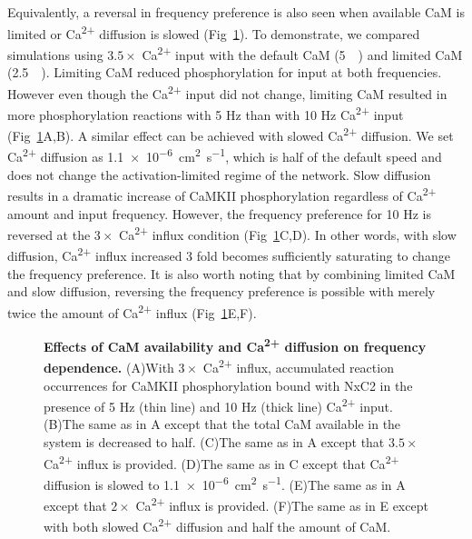 \documentclass[10pt,letterpaper]{article}
\begin{document}
Equivalently, a reversal in frequency preference is also seen when available CaM is limited or Ca\textsuperscript{2+} diffusion is slowed (Fig~\ref{fig9}). To demonstrate, we compared simulations using $3.5\times$ Ca\textsuperscript{2+} input with the default CaM (\SI{5}{\micro\Molar}) and limited CaM (\SI{2.5}{\micro\Molar}). Limiting CaM reduced phosphorylation for input at both frequencies. However even though the Ca\textsuperscript{2+} input did not change, limiting CaM resulted in more phosphorylation reactions with 5 Hz than with 10 Hz Ca\textsuperscript{2+} input (Fig~\ref{fig9}A,B). A similar effect can be achieved with slowed Ca\textsuperscript{2+} diffusion. We set Ca\textsuperscript{2+} diffusion as \SI{1.1e-6}{\square\cm\per\s}, which is half of the default speed and does not change the activation-limited regime of the network. Slow diffusion results in a dramatic increase of CaMKII phosphorylation regardless of Ca\textsuperscript{2+} amount and input frequency. However, the frequency preference for 10 Hz is reversed at the $3\times$ Ca\textsuperscript{2+} influx condition (Fig~\ref{fig9}C,D). In other words, with slow diffusion, Ca\textsuperscript{2+} influx increased 3 fold becomes sufficiently saturating to change the frequency preference. It is also worth noting that by combining limited CaM and slow diffusion, reversing the frequency preference is possible with merely twice the amount of Ca\textsuperscript{2+} influx (Fig~\ref{fig9}E,F). 

\begin{figure}[!h]
	\caption{{\bf Effects of CaM availability and Ca\textsuperscript{2+} diffusion on frequency dependence.}
	(A)With $3\times$ Ca\textsuperscript{2+} influx, accumulated reaction occurrences for CaMKII phosphorylation bound with NxC2 in the presence of 5 Hz (thin line) and 10 Hz (thick line) Ca\textsuperscript{2+} input.
	(B)The same as in A except that the total CaM available in the system is decreased to half. 
	(C)The same as in A except that $3.5\times$ Ca\textsuperscript{2+} influx is provided.
	(D)The same as in C except that Ca\textsuperscript{2+} diffusion is slowed to \SI{1.1e-6}{\square\cm\per\s}. 
	(E)The same as in A except that $2\times$ Ca\textsuperscript{2+} influx is provided.
	(F)The same as in E except with both slowed Ca\textsuperscript{2+} diffusion and half the amount of CaM.
	}
\label{fig9}
\end{figure}
\end{document}
